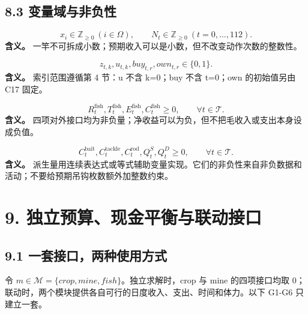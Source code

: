 \documentclass[11pt,a4paper]{article}
\begin{document}
\subsection*{8.3 变量域与非负性}

\begin{samepage}
\[
x_i\in\mathbb Z_{\ge0}\ (i\in\Omega),\qquad
N_t\in\mathbb Z_{\ge0}\ (t=0,\ldots,112). \tag{C28}
\]
\textbf{含义。} 一竿不可拆成小数；预期收入可以是小数，但不改变动作次数的整数性。\par
\end{samepage}

\begin{samepage}
\[
z_{t,k},u_{t,k},buy_{t,r},own_{t,r}\in\{0,1\}. \tag{C29}
\]
\textbf{含义。} 索引范围遵循第 4 节：u 不含 k=0；buy 不含 t=0；own 的初始值另由 C17 固定。\par
\end{samepage}

\begin{samepage}
\[
R_t^{\mathrm{fish}},T_t^{\mathrm{fish}},E_t^{\mathrm{fish}},C_t^{\mathrm{fish}}\ge0,\qquad\forall t\in\mathcal T. \tag{C30}
\]
\textbf{含义。} 四项对外接口均为非负量；净收益可以为负，但不把毛收入或支出本身设成负值。\par
\end{samepage}

\begin{samepage}
\[
C_t^{\mathrm{bait}},C_t^{\mathrm{tackle}},C_t^{\mathrm{rod}},Q_t^S,Q_t^D\ge0,
\qquad\forall t\in\mathcal T. \tag{C31}
\]
\textbf{含义。} 派生量用连续表达式或等式辅助变量实现。它们的非负性来自非负数据和活动；不要给预期吊钩枚数额外加整数约束。\par
\end{samepage}

\section*{\color{modelblue}9. 独立预算、现金平衡与联动接口}

\subsection*{9.1 一套接口，两种使用方式}

令 $m\in\mathcal M=\{crop,mine,fish\}$。独立求解时，crop 与 mine 的四项接口均取 0；联动时，两个模块提供各自可行的日度收入、支出、时间和体力。以下 G1-G6 只建立一套。\par
\end{document}

